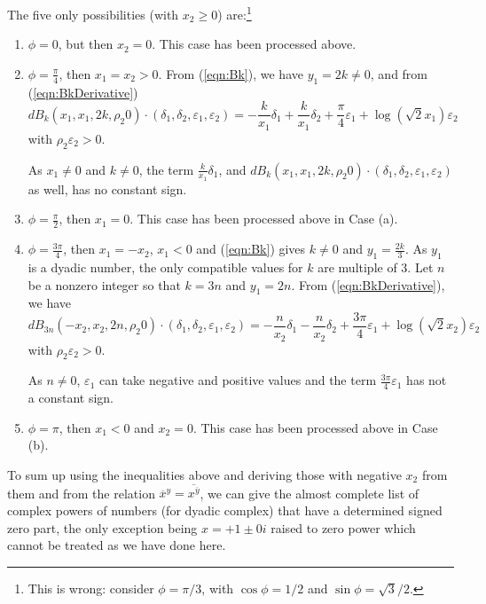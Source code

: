 \documentclass [11pt]{article}
\renewcommand {\epsilon}{\varepsilon}
\renewcommand {\geq}{\geqslant}
\begin{document}
\begin {enumerate}
  The five only possibilities (with $x_2 \geq 0$) are:\footnote{This is wrong:
 consider $\phi = \pi/3$, with $\cos \phi = 1/2$ and $\sin \phi = \sqrt{3}/2$.}
  \begin{enumerate}
  \item $\phi = 0$, but then $x_2=0$.
    This case has been processed above.
  \item $\phi = \frac{\pi}{4}$, then $x_1 = x_2 > 0$.
    From (\ref{eqn:Bk}), we have $y_1 = 2k \neq 0$, and from
    (\ref{eqn:BkDerivative})
    \[
    dB_k(x_1, x_1, 2k, \rho_2 0)\cdot(\delta_1, \delta_2, \epsilon_1,
    \epsilon_2) = -\frac{k}{x_1}\delta_1 + \frac{k}{x_1}\delta_2 +
    \frac{\pi}{4}\epsilon_1 + \log(\sqrt{2}x_1)\epsilon_2
    \]
    with $\rho_2\epsilon_2>0$.

    As $x_1 \neq 0$ and $k \neq 0$, the term $\frac{k}{x_1}\delta_1$, and
    $dB_k(x_1, x_1, 2k, \rho_2 0)\cdot(\delta_1, \delta_2, \epsilon_1,
    \epsilon_2)$ as well, has no constant sign.
  \item $\phi = \frac{\pi}{2}$, then $x_1 = 0$.
    This case has been processed above in Case (a).
  \item $\phi = \frac{3\pi}{4}$, then $x_1 = -x_2$, $x_1 < 0$ and
    (\ref{eqn:Bk}) gives $k \neq 0$ and $y_1 = \frac{2k}{3}$.
    As $y_1$ is a dyadic number, the only compatible values for $k$ are
    multiple of 3.
    Let $n$ be a nonzero integer so that $k = 3n$ and $y_1 = 2n$.
    From (\ref{eqn:BkDerivative}), we have
    \[
    dB_{3n}(-x_2, x_2, 2n, \rho_2 0)\cdot(\delta_1, \delta_2, \epsilon_1,
    \epsilon_2) = -\frac{n}{x_2}\delta_1 - \frac{n}{x_2}\delta_2 +
    \frac{3\pi}{4}\epsilon_1 + \log(\sqrt{2}x_2)\epsilon_2
    \]
    with $\rho_2\epsilon_2 >0$.

    As $n \neq 0$, $\epsilon_1$ can take negative and positive values and
    the term $\frac{3\pi}{4}\epsilon_1$ has not a constant sign.
  \item $\phi = \pi$, then $x_1<0$ and $x_2 = 0$.
    This case has been processed above in Case (b).
  \end{enumerate}
\end {enumerate}

To sum up using the inequalities above and deriving those with negative $x_2$
from them and from the relation $\overline{x}^y =
\overline{x^{\overline{y}}}$, we can give the almost complete list of complex
powers of numbers (for dyadic complex) that have a determined signed zero
part, the only exception being $x=+1 \pm 0i$ raised to zero power which cannot
be treated as we have done here.
\end{document}
